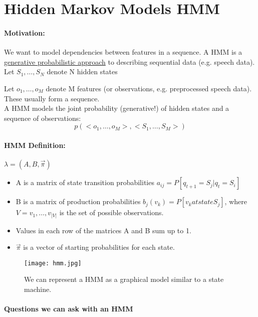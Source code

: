 
\section*{Hidden Markov Models HMM}
\paragraph{Motivation:} We want to model dependencies between features in a sequence. A HMM is a \underline{generative probabilistic approach} to describing sequential data (e.g. speech data).\\

Let \(S_1,\dots, S_N\) denote N hidden states

Let \(o_1,\dots, o_M\) denote M features (or observations, e.g. preprocessed speech data). These usually form a sequence.\\

A HMM models the joint probability (generative!) of hidden states and a sequence of observations:
\[p(<o_1,\dots, o_M>, <S_1,\dots, S_M>)\]

\paragraph{HMM Definition:} \(\lambda = (A, B, \vec{\pi})\)
\begin{itemize}
	\item A is a matrix of state transition probabilities \(a_{ij} = P[q_{t+1} = S_j | q_t = S_i]\)
	\item B is a matrix of production probabilities \(b_j(v_k) = P[v_k at state S_j]\), where \(V={v_1,\dots,v_{|V|}}\) is the set of possible observations.
	\item Values in each row of the matrices A and B sum up to 1.
	\item \(\vec{\pi}\) is a vector of starting probabilities for each state.
\end{itemize}

\begin{figure}[H]
	\centering
	\texttt{[image: hmm.jpg]}
	\caption{We can represent a HMM as a graphical model similar to a state machine.}
\end{figure}

\paragraph{Questions we can ask with an HMM}

